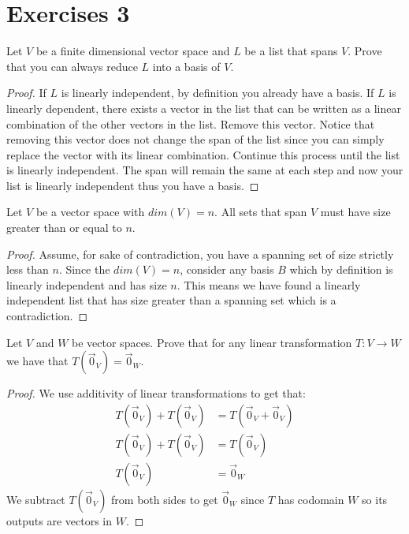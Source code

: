 \section{Exercises 3}
\begin{exercise}
    Let $V$ be a finite dimensional vector space and $L$ be a list that spans $V$. Prove that you can always reduce $L$ into a basis of $V$.
\end{exercise}
\begin{proof}
    If $L$ is linearly independent, by definition you already have a basis. If $L$ is linearly dependent, there exists a vector in the list that can be written as a linear combination of the other vectors in the list. Remove this vector. Notice that removing this vector does not change the span of the list since you can simply replace the vector with its linear combination. Continue this process until the list is linearly independent. The span will remain the same at each step and now your list is linearly independent thus you have a basis.
\end{proof}
\begin{exercise}
    Let $V$ be a vector space with $dim(V)=n$. All sets that span $V$ must have size greater than or equal to $n$.
\end{exercise}
\begin{proof}
    Assume, for sake of contradiction, you have a spanning set of size strictly less than $n$. Since the $dim(V)=n$, consider any basis $B$ which by definition is linearly independent and has size $n$. This means we have found a linearly independent list that has size greater than a spanning set which is a contradiction.
\end{proof}
\begin{exercise}
    Let $V$ and $W$ be vector spaces. Prove that for any linear transformation $T:V\to W$ we have that $T(\vec{0}_V)=\vec{0}_W$.
\end{exercise}
\begin{proof}
    We use additivity of linear transformations to get that:
    \begin{align*}
        T(\vec{0}_V)+T(\vec{0}_V)&=T(\vec{0}_V+\vec{0}_V)\\
        T(\vec{0}_V)+T(\vec{0}_V)&=T(\vec{0}_V)\\
        T(\vec{0}_V)&=\vec{0}_W
    \end{align*}
    We subtract $T(\vec{0}_V)$ from both sides to get $\vec{0}_W$ since $T$ has codomain $W$ so its outputs are vectors in $W$.
\end{proof}
